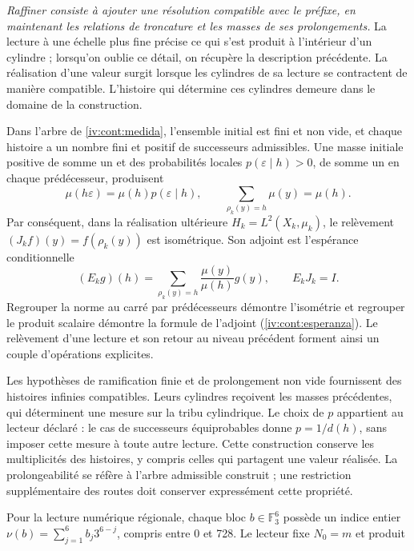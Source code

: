 \emph{Raffiner consiste à ajouter une résolution compatible avec le préfixe,
en maintenant les relations de troncature et les masses de ses prolongements.}
La lecture à une échelle plus fine précise ce qui s’est produit à l’intérieur d’un
cylindre ; lorsqu’on oublie ce détail, on récupère la description précédente.
La réalisation d’une valeur surgit lorsque les cylindres de sa lecture se
contractent de manière compatible. L’histoire qui détermine ces cylindres
demeure dans le domaine de la construction.

Dans l’arbre de \cref{iv:cont:medida}, l’ensemble initial est fini et non
vide, et chaque histoire a un nombre fini et positif de successeurs
admissibles. Une masse initiale positive de somme un et des probabilités locales
\(p(\varepsilon\mid h)>0\), de somme un en chaque prédécesseur, produisent
\[
 \mu(h\varepsilon)=\mu(h)p(\varepsilon\mid h),\qquad
 \sum_{\rho_k(y)=h}\mu(y)=\mu(h).
\]
Par conséquent, dans la réalisation ultérieure
\(H_k=L^2(X_k,\mu_k)\), le relèvement
\((J_kf)(y)=f(\rho_k(y))\) est isométrique. Son adjoint est l’espérance
conditionnelle
\[
 (E_kg)(h)=\sum_{\rho_k(y)=h}
                  \frac{\mu(y)}{\mu(h)}g(y),
 \qquad E_kJ_k=I.
\]
Regrouper la norme au carré par prédécesseurs démontre l’isométrie et regrouper le
produit scalaire démontre la formule de l’adjoint
(\cref{iv:cont:esperanza}). Le relèvement d’une lecture et son retour
au niveau précédent forment ainsi un couple d’opérations explicites.

Les hypothèses de ramification finie et de prolongement non vide fournissent
des histoires infinies compatibles. Leurs cylindres reçoivent les masses précédentes,
qui déterminent une mesure sur la tribu cylindrique. Le choix de
\(p\) appartient au lecteur déclaré : le cas de successeurs équiprobables donne
\(p=1/d(h)\), sans imposer cette mesure à toute autre lecture. Cette
construction conserve les multiplicités des histoires, y compris celles qui
partagent une valeur réalisée. La prolongeabilité se réfère à l’arbre
admissible construit ; une restriction supplémentaire des routes doit conserver
expressément cette propriété.

Pour la lecture numérique régionale, chaque bloc
\(b\in\mathbb F_3^6\) possède un indice entier
\(\nu(b)=\sum_{j=1}^6 b_j3^{6-j}\), compris entre 0 et 728.
Le lecteur fixe \(N_0=m\) et produit

